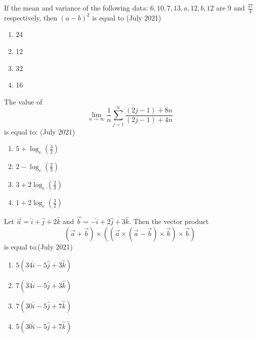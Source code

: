 
\iffalse
\title{Assignment}
\author{EE24BTECH11035}
\section{mcq-single}
\fi


\item
If the mean and variance of the following data:  
$ 6, 10, 7, 13, a, 12, b, 12 $ are $ 9 $ and $ \frac{37}{4} $ respectively, then $ (a - b)^2 $ is equal to	\hfill{(July 2021)}
\begin{enumerate}
    \item 24 
    \item 12
    \item 32
    \item 16
\end{enumerate}

\item
The value of  
\begin{equation*}
\lim_{n \to \infty} \frac{1}{n} \sum_{j=1}^{n} \frac{(2j - 1) + 8n}{(2j-1)+4n}
\end{equation*}
is equal to: 	
\hfill{(July 2021)}
\begin{enumerate}
    \item $5 + \log_e \left(\frac{3}{2}\right)$
    \item $2 - \log_e \left(\frac{2}{3}\right)$
    \item $3 + 2 \log_e \left(\frac{2}{3}\right)$
    \item $1 + 2 \log_e \left(\frac{3}{2}\right)$
\end{enumerate}

\item
Let $ \vec{a} = \hat{i} + \hat{j} + 2\hat{k} $ and $ \vec{b} = -\hat{i} + 2\hat{j} + 3\hat{k} $. Then the vector product
\begin{equation*}
    (\vec{a} + \vec{b}) \times \left( \left( \vec{a}\times(\vec{a} - \vec{b}) \times \vec{b} \right) \times \vec{b} \right)
\end{equation*}
is equal to:\hfill{(July 2021)}
\begin{enumerate}
    \item $5(34\hat{i} - 5\hat{j} + 3\hat{k})$
    \item $7(34\hat{i} - 5\hat{j} + 3\hat{k})$
    \item $7(30\hat{i} - 5\hat{j} + 7\hat{k})$
    \item $5(30\hat{i} - 5\hat{j} + 7\hat{k})$
\end{enumerate}

